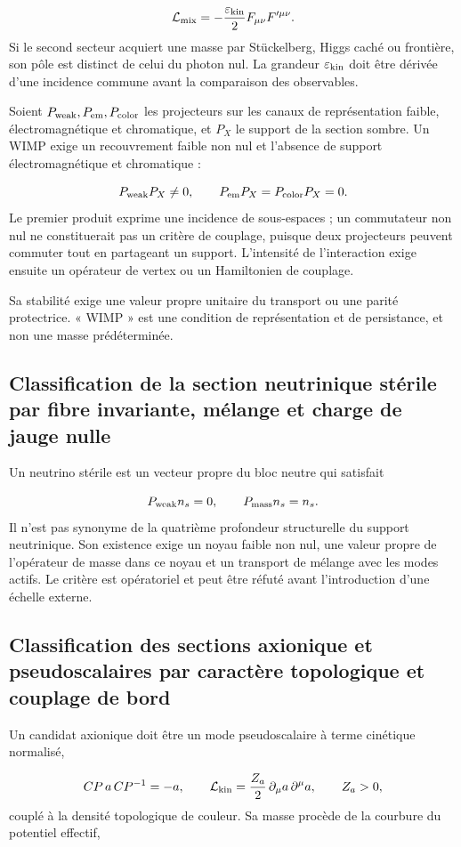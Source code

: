 \[
\mathcal L_{\rm mix}
=-\frac{\varepsilon_{\rm kin}}2F_{\mu\nu}F'^{\mu\nu}.
\]
Si le second secteur acquiert une masse par Stückelberg, Higgs caché ou frontière, son pôle est distinct de celui du photon nul. La grandeur \(\varepsilon_{\rm kin}\) doit être dérivée d'une incidence commune avant la comparaison des observables.

Soient \(P_{\rm weak},P_{\rm em},P_{\rm color}\) les projecteurs sur les canaux de représentation faible, électromagnétique et chromatique, et \(P_X\) le support de la section sombre. Un WIMP exige un recouvrement faible non nul et l'absence de support électromagnétique et chromatique :

\[
P_{\rm weak}P_X\ne0,
\qquad
P_{\rm em}P_X=P_{\rm color}P_X=0.
\]
Le premier produit exprime une incidence de sous-espaces ; un commutateur non nul ne constituerait pas un critère de couplage, puisque deux projecteurs peuvent commuter tout en partageant un support. L'intensité de l'interaction exige ensuite un opérateur de vertex ou un Hamiltonien de couplage.

Sa stabilité exige une valeur propre unitaire du transport ou une parité protectrice. « WIMP » est une condition de représentation et de persistance, et non une masse prédéterminée.

\subsection{Classification de la section neutrinique stérile par fibre invariante, mélange et charge de jauge nulle}
Un neutrino stérile est un vecteur propre du bloc neutre qui satisfait

\[
P_{\rm weak}n_s=0,
\qquad
P_{\rm mass}n_s=n_s.
\]
Il n'est pas synonyme de la quatrième profondeur structurelle du support neutrinique. Son existence exige un noyau faible non nul, une valeur propre de l'opérateur de masse dans ce noyau et un transport de mélange avec les modes actifs. Le critère est opératoriel et peut être réfuté avant l'introduction d'une échelle externe.

\subsection{Classification des sections axionique et pseudoscalaires par caractère topologique et couplage de bord}
Un candidat axionique doit être un mode pseudoscalaire à terme cinétique normalisé,

\[
CP\,a\,CP^{-1}=-a,
\qquad
\mathcal L_{\rm kin}=\frac{Z_a}{2}\,\partial_\mu a\,\partial^\mu a,
\qquad Z_a>0,
\]
couplé à la densité topologique de couleur. Sa masse procède de la courbure du potentiel effectif,

